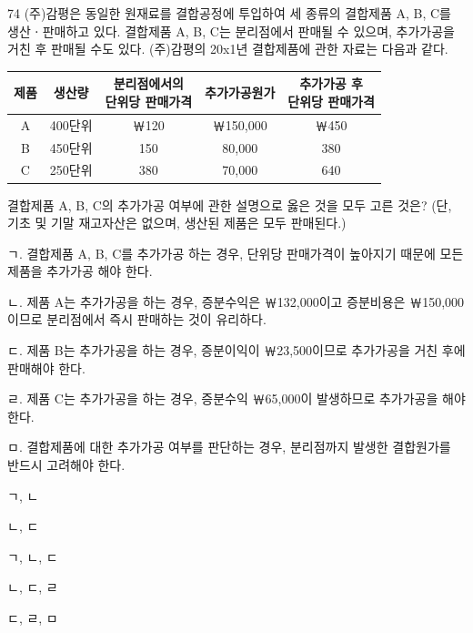 \begin{question}{74}
(주)감평은 동일한 원재료를 결합공정에 투입하여 세 종류의 결합제품 A, B, C를 생산ㆍ판매하고 있다. 결합제품 A, B, C는 분리점에서 판매될 수 있으며, 추가가공을 거친 후 판매될 수도 있다. (주)감평의 20x1년 결합제품에 관한 자료는 다음과 같다.
\par{\small\centering\begin{tabular}{|c|c|c|c|c|}\hline
제품 & 생산량 & \makecell{분리점에서의\\단위당 판매가격} & 추가가공원가 & \makecell{추가가공 후\\단위당 판매가격} \\ \hline
A & 400단위 & ￦120 & ￦150,000 & ￦450 \\
B & 450단위 & 150 & 80,000 & 380 \\
C & 250단위 & 380 & 70,000 & 640 \\ \hline
\end{tabular}\par}
결합제품 A, B, C의 추가가공 여부에 관한 설명으로 옳은 것을 모두 고른 것은? (단, 기초 및 기말 재고자산은 없으며, 생산된 제품은 모두 판매된다.)
\begin{framedtext}
ㄱ. 결합제품 A, B, C를 추가가공 하는 경우, 단위당 판매가격이 높아지기 때문에 모든 제품을 추가가공 해야 한다. \par
ㄴ. 제품 A는 추가가공을 하는 경우, 증분수익은 ￦132,000이고 증분비용은 ￦150,000이므로 분리점에서 즉시 판매하는 것이 유리하다. \par
ㄷ. 제품 B는 추가가공을 하는 경우, 증분이익이 ￦23,500이므로 추가가공을 거친 후에 판매해야 한다. \par
ㄹ. 제품 C는 추가가공을 하는 경우, 증분수익 ￦65,000이 발생하므로 추가가공을 해야 한다. \par
ㅁ. 결합제품에 대한 추가가공 여부를 판단하는 경우, 분리점까지 발생한 결합원가를 반드시 고려해야 한다. \par
\end{framedtext}
\begin{choices}
  \item ㄱ, ㄴ
  \item ㄴ, ㄷ
  \item ㄱ, ㄴ, ㄷ
  \item ㄴ, ㄷ, ㄹ
  \item ㄷ, ㄹ, ㅁ
\end{choices}
\end{question}
